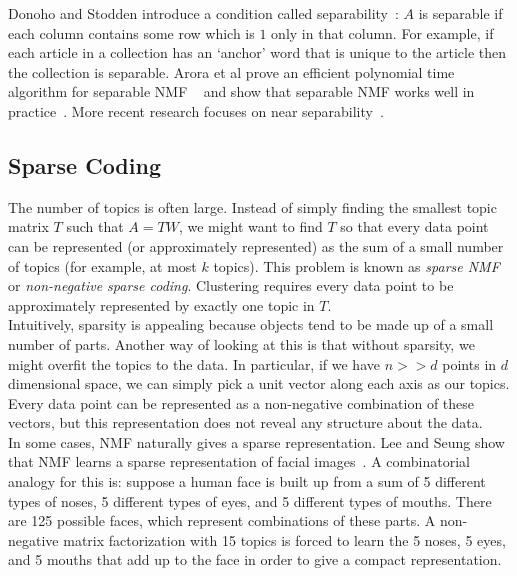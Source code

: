 Donoho and Stodden introduce a condition called separability~\cite{NIPS2003_2463}: $A$ is separable if each column contains some row which is $1$ only in that column. For example, if each article in a collection has an `anchor' word that is unique to the article then the collection is separable. Arora et al prove an efficient polynomial time algorithm for separable NMF ~\cite{DBLP:arora} and show that separable NMF works well in practice~\cite{DBLP:arora-practice}. More recent research focuses on near separability~\cite{Gillis:2014:RNN:2627435.2638575}.

\subsection{Sparse Coding}

 The number of topics is often large. Instead of simply finding the smallest topic matrix $T$ such that $A = TW$, we might want to find $T$ so that every data point can be represented (or approximately represented) as the sum of a small number of topics (for example, at most $k$ topics). This problem is known as \emph{sparse NMF} or \emph{non-negative sparse coding}. Clustering requires every data point to be approximately represented by exactly one topic in $T$.
 \\
 
Intuitively, sparsity is appealing because objects tend to be made up of a small number of parts. Another way of looking at this is that without sparsity, we might overfit the topics to the data. In particular, if we have $n >> d$ points in $d$ dimensional space, we can simply pick a unit vector along each axis as our topics. Every data point can be represented as a non-negative combination of these vectors, but this representation does not reveal any structure about the data.
\\

In some cases, NMF naturally gives a sparse representation. Lee and Seung show that NMF learns a sparse representation of facial images~\cite{leeseung95}. A combinatorial analogy for this is: suppose a human face is built up from a sum of 5 different types of noses, 5 different types of eyes, and 5 different types of mouths. There are 125 possible faces, which represent combinations of these parts. A non-negative matrix factorization with 15 topics is forced to learn the 5 noses, 5 eyes, and 5 mouths that add up to the face in order to give a compact representation.
\\

